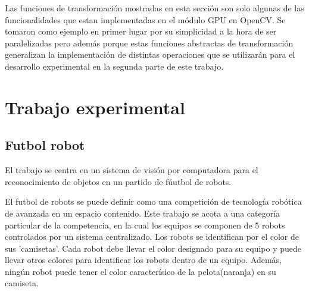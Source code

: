 \documentclass[a4paper,10pt]{report}
\begin{document}
Las funciones de transformación mostradas en esta sección son solo algunas de las funcionalidades que estan implementadas en el módulo GPU en OpenCV. 
Se tomaron como ejemplo en primer lugar por su simplicidad a la hora de ser paralelizadas pero además porque estas funciones abstractas de transformación generalizan la implementación
de distintas operaciones que se utilizarán para el desarrollo experimental en la segunda parte de este trabajo.























































\chapter{Trabajo experimental}
\section{Futbol robot}
El trabajo se centra en un sistema de visión por computadora para el reconocimiento de objetos en un partido de fúutbol de robots.

El futbol de robots se puede definir como una competición de tecnología robótica de avanzada en un espacio contenido.
Este trabajo se acota a una categoría particular de la competencia, en la cual los equipos se componen de 5 robots controlados por un sistema centralizado. 
Los robots se identifican por el color de sus 'camisetas'. Cada robot debe llevar el color designado para su equipo y puede llevar otros colores para identificar los robots dentro de un equipo.
Además, ningún robot puede tener el color caracterísico de la pelota(naranja) en su camiseta.
\end{document}
